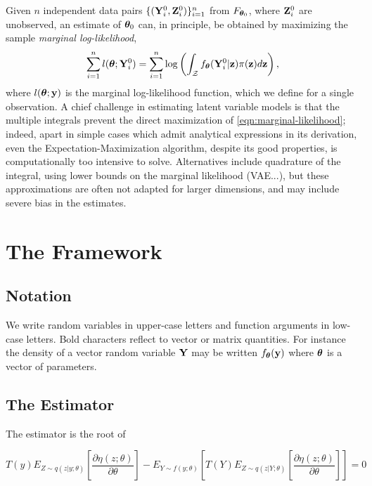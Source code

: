 \documentclass[twoside,11pt]{article}
\begin{document}
Given $n$ independent data pairs $\{({\bf Y}_i^0, {\bf Z}_i^0)\}_{i=1}^n$ from $F_{{\bm{\theta}}_0}$, where ${\bf Z}_i^0$ are unobserved, an estimate of ${\bm{\theta}}_0$ can, in principle, be obtained by maximizing the sample \textit{marginal log-likelihood}, 
%   
\begin{equation}
\sum_{i=1}^n l({\bm{\theta}}; {\bf Y}_{i}^0)= \sum_{i=1}^n \log\left(\int_{\mathcal Z}f_{\bm{\theta}}({\bf Y}_{i}^0|{\bf z})\pi({\bf z})d{\bf z}\right),
    \label{eqn:marginal-likelihood}
\end{equation}
%
where $l({\bm{\theta}}; {\bf y})$ is the marginal log-likelihood function, which we define for a single observation.
A chief challenge in estimating latent variable models is that the multiple integrals prevent the direct maximization of \eqref{eqn:marginal-likelihood}; indeed, apart in simple cases which admit analytical expressions in its derivation, even the Expectation-Maximization algorithm, despite its good properties, is computationally too intensive to solve. Alternatives include quadrature of the integral, using lower bounds on the marginal likelihood (VAE...), but these approximations are often not adapted for larger dimensions, and may include severe bias in the estimates.



\section{The Framework}


\subsection{Notation}
We write random variables in upper-case letters and function arguments in low-case letters. Bold characters reflect to vector or matrix quantities. For instance the density of a vector random variable ${\bf Y}$ may be written $f_{\bm{\theta}}({\bf y})$ where ${\bm{\theta}}$ is  a vector of parameters. 


\subsection{The Estimator}
The estimator is the root of  

$$
T(y) E_{Z\sim q(z|y;\theta)}\left[\frac{\partial \eta(z;\theta)}{\partial \theta}\right] - E_{Y\sim f(y;\theta)}\left[T(Y) E_{Z\sim q(z|Y;\theta)}\left[\frac{\partial \eta(z;\theta)}{\partial \theta}\right]\right] = 0
$$
\end{document}
